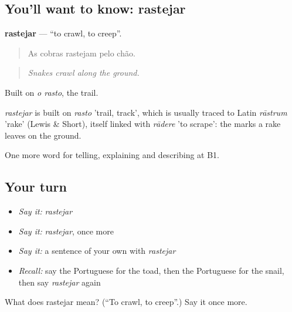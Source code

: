 \subsection*{You'll want to know: rastejar}
\textbf{rastejar} — \textquotedblleft{}to crawl, to creep\textquotedblright{}.

\begin{quote}
As cobras rastejam pelo chão.
\end{quote}

\begin{quote}
\emph{Snakes crawl along the ground.}
\end{quote}

Built on \emph{o rasto}, the trail.

\begin{cousinweb}
\emph{rastejar} is built on \emph{rasto} 'trail, track', which is usually traced to Latin \emph{rāstrum} 'rake' (Lewis \& Short), itself linked with \emph{rādere} 'to scrape': the marks a rake leaves on the ground.
\end{cousinweb}

\begin{grammarlens}[title={What you've built}]
One more word for telling, explaining and describing at B1.
\end{grammarlens}

\subsection*{Your turn}
\begin{itemize}
\raggedright
  \item \emph{Say it:} \emph{rastejar}
  \item \emph{Say it:} \emph{rastejar}, once more
  \item \emph{Say it:} a sentence of your own with \emph{rastejar}
  \item \emph{Recall:} say the Portuguese for the toad, then the Portuguese for the snail, then say \emph{rastejar} again
\end{itemize}

\begin{tcolorbox}[breakable,colback=teal!4,colframe=teal!35!black,title={Before you move on}]
What does rastejar mean? (\textquotedblleft{}To crawl, to creep\textquotedblright{}.) Say it once more.
\end{tcolorbox}
